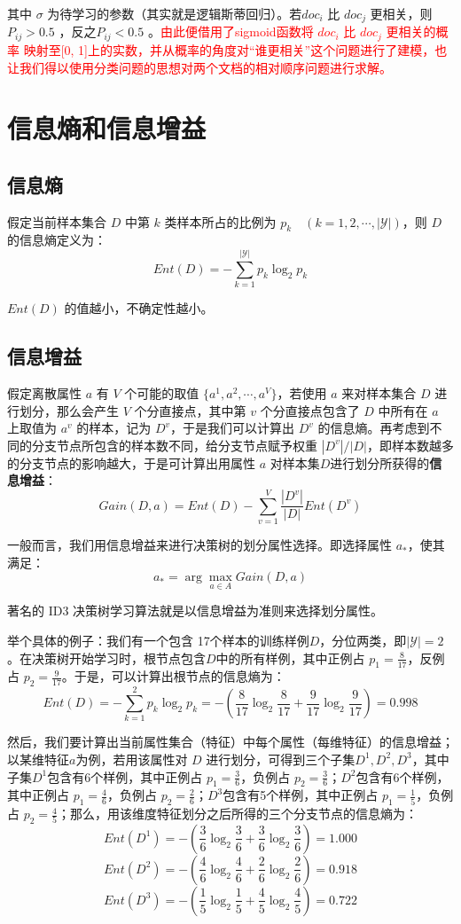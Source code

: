 \documentclass[12pt]{article}
\begin{document}
其中 $\sigma$ 为待学习的参数（其实就是逻辑斯蒂回归）。若$doc_i$ 比 $doc_j$ 更相关，则 $P_{ij} > 0.5$ ，反之$P_{ij} < 0.5$ 。\textcolor{red}{由此便借用了sigmoid函数将 $doc_i$ 比 $doc_j$ 更相关的概率 映射至[0, 1]上的实数，并从概率的角度对“谁更相关”这个问题进行了建模，也让我们得以使用分类问题的思想对两个文档的相对顺序问题进行求解。}

\section{信息熵和信息增益\cite{Book_Machine_Learning_ZhouZhihua}}
\subsection{信息熵}
假定当前样本集合 $D$ 中第 $k$ 类样本所占的比例为 $p_k \quad (k = 1, 2, \cdots, |\mathcal{Y}|)$，则 $D$ 的信息熵定义为：
$$
Ent(D) = -\sum_{k=1}^{|\mathcal{Y}|}p_k\log_2{p_k}
$$

$Ent(D)$ 的值越小，不确定性越小。

\subsection{信息增益}
假定离散属性 $a$ 有 $V$ 个可能的取值 $\{a^1, a^2, \cdots, a^V\}$，若使用 $a$ 来对样本集合 $D$ 进行划分，那么会产生 $V$ 个分直接点，其中第 $v$ 个分直接点包含了 $D$ 中所有在 $a$  上取值为 $a^v$ 的样本，记为 $D^v$，于是我们可以计算出 $D^v$ 的信息熵。再考虑到不同的分支节点所包含的样本数不同，给分支节点赋予权重 $|D^v|/|D|$，即样本数越多的分支节点的影响越大，于是可计算出用属性 $a$ 对样本集$D$进行划分所获得的\textbf{信息增益}：
$$
Gain(D, a) = Ent(D) - \sum_{v=1}^{V}\frac{|D^v|}{|D|}Ent(D^v)
$$

一般而言，我们用信息增益来进行决策树的划分属性选择。即选择属性 $a_*$，使其满足：
$$
a_* = \arg\max_{a \in A}Gain(D,a)
$$

著名的 ID3 决策树学习算法就是以信息增益为准则来选择划分属性。

举个具体的例子：我们有一个包含 17个样本的训练样例$D$，分位两类，即$|\mathcal{Y}| = 2$。在决策树开始学习时，根节点包含$D$中的所有样例，其中正例占 $p_1 = \frac{8}{17}$，反例占 $p_2 = \frac{9}{17}$。于是，可以计算出根节点的信息熵为：
$$
Ent(D) = -\sum_{k=1}^2p_k\log_2{p_k} = -(\frac{8}{17}\log_2\frac{8}{17} + \frac{9}{17}\log_2\frac{9}{17}) = 0.998
$$

然后，我们要计算出当前属性集合（特征）中每个属性（每维特征）的信息增益；以某维特征$a$为例，若用该属性对 $D$ 进行划分，可得到三个子集$D^1, D^2, D^3$，其中子集$D^1$包含有6个样例，其中正例占 $p_1 = \frac{3}{6}$，负例占 $p_2 = \frac{3}{6}$；$D^2$包含有6个样例，其中正例占 $p_1 = \frac{4}{6}$，负例占 $p_2 = \frac{2}{6}$；$D^3$包含有5个样例，其中正例占 $p_1 = \frac{1}{5}$，负例占 $p_2 = \frac{4}{5}$；那么，用该维度特征划分之后所得的三个分支节点的信息熵为：
$$
Ent(D^1) = -(\frac{3}{6}\log_2\frac{3}{6} + \frac{3}{6}\log_2\frac{3}{6}) = 1.000
$$
$$
Ent(D^2) = -(\frac{4}{6}\log_2\frac{4}{6} + \frac{2}{6}\log_2\frac{2}{6}) = 0.918
$$
$$
Ent(D^3) = -(\frac{1}{5}\log_2\frac{1}{5} + \frac{4}{5}\log_2\frac{4}{5}) = 0.722
$$
\end{document}
